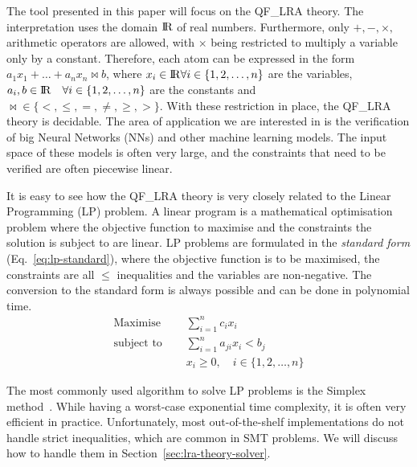 \documentclass[runningheads]{llncs}
\begin{document}
The tool presented in this paper will focus on the QF\_LRA theory.
The interpretation uses the domain ${\rm I\!R}$ of real numbers.
Furthermore, only $+, -, \times,$ arithmetic operators are allowed, with $\times$ being restricted to multiply a variable only by a constant.
Therefore, each atom can be expressed in the form $a_1x_1 + \ldots + a_nx_n \bowtie b$, where $x_i \in {\rm I\!R} \forall i \in \{1, 2, \dots, n\}$ are the variables, $a_i, b \in {\rm I\!R} \quad \forall i \in \{1, 2, \dots, n\}$ are the constants and $\bowtie \in \{<, \le, =, \ne, \ge, >\}$.
With these restriction in place, the QF\_LRA theory is decidable.
The area of application we are interested in is the verification of big Neural Networks (NNs) and other machine learning models.
The input space of these models is often very large, and the constraints that need to be verified are often piecewise linear.

It is easy to see how the QF\_LRA theory is very closely related to the Linear Programming (LP) problem.
A linear program is a mathematical optimisation problem where the objective function to maximise and the constraints the solution is subject to are linear.
LP problems are formulated in the \textit{standard form} (Eq.~\ref{eq:lp-standard}), where the objective function is to be maximised, the constraints are all $\le$ inequalities and the variables are non-negative.
The conversion to the standard form is always possible and can be done in polynomial time.
\begin{equation}
    \label{eq:lp-standard}
    \begin{split}
        \text{Maximise }   \quad & \sum_{i=1}^{n} c_i x_i                      \\
        \text{subject to } \quad & \sum_{i=1}^{n} a_{ji}x_{i} < b_j            \\
                                 & x_i \ge 0,  \quad i \in \{1, 2, \ldots, n\}
    \end{split}
\end{equation}

The most commonly used algorithm to solve LP problems is the Simplex method~\cite{ref:simplex}.
While having a worst-case exponential time complexity, it is often very efficient in practice.
Unfortunately, most out-of-the-shelf implementations do not handle strict inequalities, which are common in SMT problems.
We will discuss how to handle them in Section~\ref{sec:lra-theory-solver}.
\end{document}
